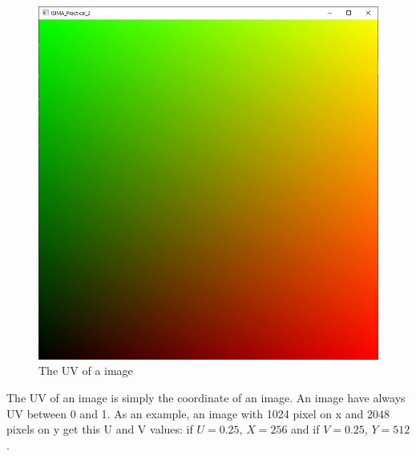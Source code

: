 \documentclass{article}
\begin{document}
\begin{figure}[h]
	\centering
	\includegraphics[scale=0.6]{images/uv.png}
	\caption{The UV of a image}
\end{figure}

The UV of an image is simply the coordinate of an image. An image have always UV between 0 and 1. As an example, an image with 1024 pixel on x and 2048 pixels on y get this U and V values: if $U = 0.25$, $X = 256$ and if $V = 0.25$, $Y = 512$.
\end{document}
